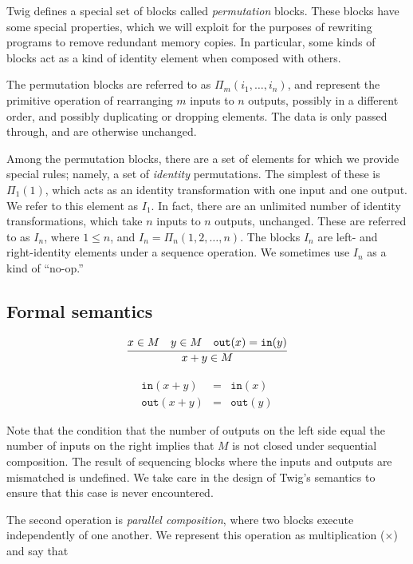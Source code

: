 Twig defines a special set of blocks called \emph{permutation} blocks. These blocks have some special properties, which we will exploit for the purposes of rewriting programs to remove redundant memory copies. In particular, some kinds of blocks act as a kind of identity element when composed with others.

The permutation blocks are referred to as $\Pi_m(i_1,\ldots,i_n)$, and represent the primitive operation of rearranging $m$ inputs to $n$ outputs, possibly in a different order, and possibly duplicating or dropping elements. The data is only passed through, and are otherwise unchanged.

Among the permutation blocks, there are a set of elements for which we provide special rules; namely, a set of \emph{identity} permutations. The simplest of these is $\Pi_1(1)$, which acts as an identity transformation with one input and one output. We refer to this element as $I_1$. In fact, there are an unlimited number of identity transformations, which take $n$ inputs to $n$ outputs, unchanged. These are referred to as $I_n$, where $1 \leq n$, and $I_n = \Pi_n(1,2,\ldots,n)$. The blocks $I_n$ are left- and right-identity elements under a sequence operation. We sometimes use $I_n$ as a kind of ``no-op.''

\subsection{Formal semantics}

\[
\infer
{x+y \in M}
{x \in M \quad y \in M \quad \mathtt{out}(x) = \mathtt{in}(y)}
\]

\begin{eqnarray*}
\mathtt{in} (x+y) &=& \mathtt{in}(x)\\
\mathtt{out}(x+y) &=& \mathtt{out}(y)
\end{eqnarray*}
 
Note that the condition that the number of outputs on the left side equal the number of inputs on the right implies that $M$ is not closed under sequential composition. The result of sequencing blocks where the inputs and outputs are mismatched is undefined. We take care in the design of Twig's semantics to ensure that this case is never encountered.

The second operation is \emph{parallel composition}, where two blocks execute independently of one another. We represent this operation as multiplication ($\times$) and say that

